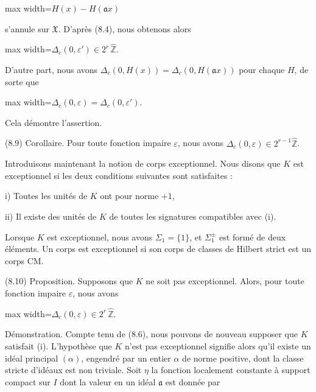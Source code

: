 \documentclass[11pt]{article}
\newcommand{\DFormula}[1]{\par\smallskip\noindent\begin{adjustbox}{max width=\linewidth}$\displaystyle #1$\end{adjustbox}\par\smallskip}
\begin{document}
\par
\DFormula{H(x)-H(𝔞x)}
\par
s’annule sur \(𝔛\). D’après (8.4), nous obtenons alors\par
\par
\DFormula{\Delta _{c}(0,\varepsilon ')\in 2^{r}\,\widehat{\mathbb{Z}}.}
\par
D’autre part, nous avons \(\Delta _{c}(0,H(x))=\Delta _{c}(0,H(𝔞x))\) pour chaque \(H\), de sorte que\par
\par
\DFormula{\Delta _{c}(0,\varepsilon )=\Delta _{c}(0,\varepsilon ').}
\par
Cela démontre l’assertion.\par
\par
(8.9) Corollaire. Pour toute fonction impaire \(\varepsilon \), nous avons \(\Delta _{c}(0,\varepsilon )\in 2^{r-1}\widehat{\mathbb{Z}}\).\par
\par
Introduisons maintenant la notion de corps exceptionnel. Nous disons que \(K\) est exceptionnel si les deux conditions suivantes sont satisfaites :\par
\par
i) Toutes les unités de \(K\) ont pour norme \(+1\),\par
\par
ii) Il existe des unités de \(K\) de toutes les signatures compatibles avec (i).\par
\par
Lorsque \(K\) est exceptionnel, nous avons \(\Sigma _{1}=\lbrace 1\rbrace \), et \(\Sigma _{1}^{\pm }\) est formé de deux éléments. Un corps est exceptionnel si son corps de classes de Hilbert strict est un corps CM.\par
\par
(8.10) Proposition. Supposons que \(K\) ne soit pas exceptionnel. Alors, pour toute fonction impaire \(\varepsilon \), nous avons\par
\par
\DFormula{\Delta _{c}(0,\varepsilon )\in 2^{r}\,\widehat{\mathbb{Z}}.}
\par
Démonstration. Compte tenu de (8.6), nous pouvons de nouveau supposer que \(K\) satisfait (i). L’hypothèse que \(K\) n’est pas exceptionnel signifie alors qu’il existe un idéal principal \((\alpha )\), engendré par un entier \(\alpha \) de norme positive, dont la classe stricte d’idéaux est non triviale. Soit \(\eta \) la fonction localement constante à support compact sur \(I\) dont la valeur en un idéal \(𝔞\) est donnée par\par
\end{document}
